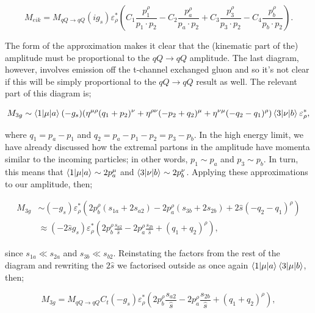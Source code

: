 \begin{equation}
M_{eik} = M_{qQ \to qQ} (i g_s) \varepsilon_\rho^* \left(C_1\frac{p_1^\rho}{p_1 \cdot p_2} - C_2\frac{p_a^\rho}{p_a \cdot p_2} + C_3\frac{p_3^\rho}{p_3 \cdot p_2} - C_4\frac{p_b^\rho}{p_b \cdot p_2}  \right).
\end{equation}

The form of the approximation makes it clear that the (kinematic part of the) amplitude must be proportional to the $qQ \to qQ$ amplitude. The last diagram, however, involves emission off the t-channel exchanged gluon and so it's not clear if this will be simply proportional to the $qQ \to qQ$ result as well. The relevant part of this diagram is;

\begin{equation}
M_{3g} \sim \mathinner{\langle1\vert\mu\vert a\rangle}_{} (- g_s)(\eta^{\mu \rho}(q_1 + p_2)^\nu + \eta^{\rho \nu}(-p_2 + q_2)^\mu + \eta^{\nu \mu}(-q_2 - q_1)^\rho) \mathinner{\langle3\vert\nu\vert b\rangle}_{} \varepsilon^*_\rho,
\end{equation}

where $q_1 = p_a - p_1$ and $q_2 = p_a - p_1 -p_2 = p_3 - p_b$. In the high energy limit, we have already discussed how the extremal partons in the amplitude have momenta similar to the incoming particles; in other words, $p_1 \sim p_a$ and $p_3 \sim p_b$. In turn, this means that $\mathinner{\langle1\vert\mu\vert a\rangle}_{} \sim 2p_a^\mu$ and $\mathinner{\langle3\vert\nu\vert b\rangle}_{} \sim 2p_b^\nu$. Applying these approximations to our amplitude, then; 

\begin{equation}
\begin{split}
M_{3g} &\sim (- g_s)\varepsilon_\rho^*(2p_b^\rho(s_{1a} + 2 s_{a2}) - 2 p_a^\rho (s_{3b} + 2 s_{2b}) + 2 \hat{s} (-q_2 - q_1)^\rho) \\
& \approx (- 2 \hat{s}  g_s)\varepsilon_\rho^*  \left (2p_b^\rho \frac{s_{a2}}{\hat{s}} - 2 p_a^\rho \frac{s_{2b}}{\hat{s}} + (q_1 + q_2)^\rho \right),
\end{split}
\end{equation}

since $s_{1a} \ll s_{2a}$ and $s_{3b} \ll s_{b2}$. Reinstating the factors from the rest of the diagram and rewriting the $2 \hat{s}$ we factorised outside as once again $\mathinner{\langle1\vert\mu\vert a\rangle}_{} \mathinner{\langle3\vert\mu\vert b\rangle}_{}$, then;

\begin{equation}
M_{3g} = M_{qQ \to qQ} C_t(-g_s)\varepsilon_\rho^*  \left (2p_b^\rho \frac{s_{a2}}{\hat{s}} - 2 p_a^\rho \frac{s_{2b}}{\hat{s}} + (q_1 + q_2)^\rho \right),
\end{equation}

